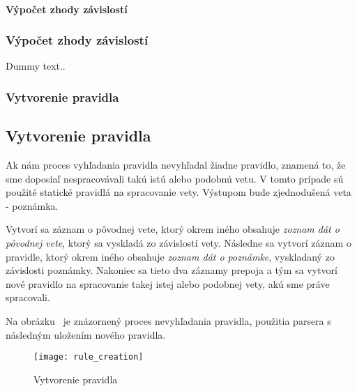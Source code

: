 %
%
{
	\paragraph{Výpočet zhody závislostí}
}
{
	\subsubsection{Výpočet zhody závislostí}
}
\label{paragraph:dependency_match}
Dummy text..

%
%
{
	\subsubsection{Vytvorenie pravidla}
}
{
	\subsection{Vytvorenie pravidla}
}
\label{subsubsection:rule_creation}
Ak nám proces vyhľadania pravidla nevyhľadal žiadne pravidlo, znamená to, že sme doposiaľ nespracovávali takú istú alebo podobnú vetu. V tomto prípade sú použité statické pravidlá na spracovanie vety. Výstupom bude zjednodušená veta - poznámka.

Vytvorí sa záznam o pôvodnej vete, ktorý okrem iného obsahuje \textit{zoznam dát o pôvodnej vete}, ktorý sa vyskladá zo závislostí vety. Následne sa vytvorí záznam o pravidle, ktorý okrem iného obsahuje \textit{zoznam dát o poznámke}, vyskladaný zo závislosti poznámky. Nakoniec sa tieto dva záznamy prepoja a tým sa vytvorí nové pravidlo na spracovanie takej istej alebo podobnej vety, akú sme práve spracovali.

Na obrázku~ je znázornený proces nevyhľadania pravidla, použitia parsera s následným uložením nového pravidla.

\begin{figure}[H]
	\begin{center}\texttt{[image: rule\_creation]}\end{center}
	\caption[Vytvorenie pravidla]{Vytvorenie pravidla}\label{fig:rule_creation}
\end{figure}